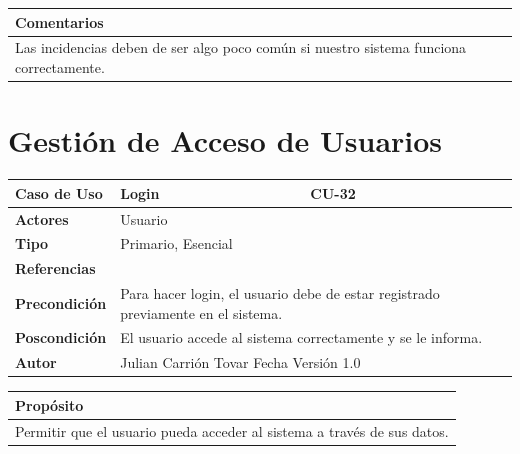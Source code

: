 \vspace{0.2cm}

\begin{table}[h!]
\centering
\begin{tabularx}{\textwidth}{|X|}
\hline
\cellcolor[HTML]{F2F2F2}\textbf{Comentarios} \\ \hline
Las incidencias deben de ser algo poco común si nuestro sistema funciona correctamente. \\ \hline
\end{tabularx}
\end{table}


\chapter{Gestión de Acceso de Usuarios}



\begin{table}[h!]
\centering
\begin{tabularx}{\textwidth}{|p{3cm}|p{8cm}|p{2cm}|}
\hline
\textbf{Caso de Uso} & Login & CU-32 \\ \hline
\textbf{Actores} & \multicolumn{2}{p{12cm}|}{Usuario} \\ \hline
\textbf{Tipo} & \multicolumn{2}{p{12cm}|}{Primario, Esencial} \\ \hline
\textbf{Referencias} & \multicolumn{2}{p{12cm}|}{} \\ \hline
\textbf{Precondición} & \multicolumn{2}{p{12cm}|}{Para hacer login, el usuario debe de estar registrado previamente en el sistema.} \\ \hline
\textbf{Poscondición} & \multicolumn{2}{p{12cm}|}{El usuario accede al sistema correctamente y se le informa.} \\ \hline
\textbf{Autor} & \multicolumn{2}{p{10cm}|}{Julian Carrión Tovar \hfill Fecha \hfill Versión 1.0} \\ \hline
\end{tabularx}
\end{table}

\vspace{0.2cm}

\begin{table}[h!]
\centering
\begin{tabularx}{\textwidth}{|X|}
\hline
\cellcolor[HTML]{F2F2F2}\textbf{Propósito} \\ \hline
Permitir que el usuario pueda acceder al sistema a través de sus datos. \\ \hline
\end{tabularx}
\end{table}

